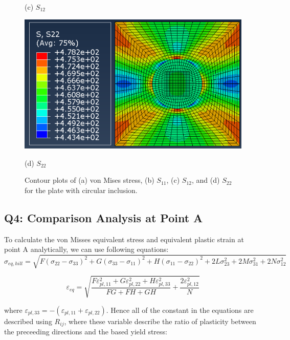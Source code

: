 \documentclass[12pt]{article}
\begin{document}
\begin{figure}[H]
\begin{minipage}{0.48\textwidth}
        \caption*{(c) $S_{12}$}
    \end{minipage}
    \hfill
    \begin{minipage}{0.48\textwidth}
        \centering
        \includegraphics[width=\textwidth]{images/S22.png}
        \caption*{(d) $S_{22}$}
    \end{minipage}
    \caption{Contour plots of (a) von Mises stress, (b) $S_{11}$, (c) $S_{12}$, and (d) $S_{22}$ for the plate with circular inclusion.}
    \label{fig:stressFields}
\end{figure}

\subsection*{Q4: Comparison Analysis at Point A}
To calculate the von Misses equivalent stress and equivalent plastic strain at point A analytically, 
we can use following equations:
\begin{equation}
    \sigma_{eq, hill} = \sqrt{
        F(\sigma_{22}-\sigma_{33})^2 + 
        G(\sigma_{33}-\sigma_{11})^2 + 
        H(\sigma_{11}-\sigma_{22})^2 + 
        2L\sigma_{23}^2 + 
        2M\sigma_{31}^2 + 
        2N\sigma_{12}^2
    }
    \label{eq:hill_yield}
\end{equation}

\begin{equation}
    \varepsilon_{eq} = \sqrt{\frac{F\varepsilon_{pl,11}^2 + G\varepsilon_{pl,22}^2 + H\varepsilon_{pl,33}^2}{FG+FH+GH} + \frac{2\varepsilon_{pl,12}^2}{N}}
    \label{eq:equivalent_plastic_strain}
\end{equation}

where $\varepsilon_{pl,33}=-(\varepsilon_{pl,11}+\varepsilon_{pl,22})$. Hence all of the constant in the equations
are described using $R_{ij}$, where these variable describe the ratio of plasticity between the preceeding directions and the based
yield stress:
\end{document}
